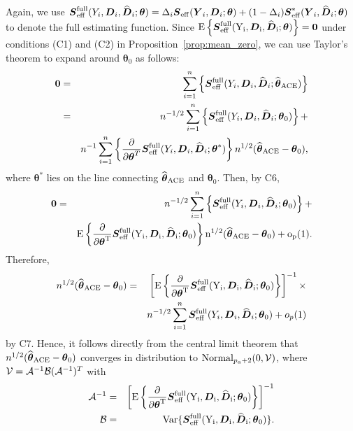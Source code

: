 \documentclass[12pt]{article}
\def\wh{\widehat}
\def\Normal{\hbox{Normal}}
\def\bse{\begin{eqnarray*}}
\def\ese{\end{eqnarray*}}
\def\bse{\begin{eqnarray*}}
\def\ese{\end{eqnarray*}}
\def\wh{\widehat}
\def\bS{{\mathbf S}}
\def\bzero{{\mathbf 0}}
\def\btheta{{\boldsymbol{\theta}}}
\def\bzero{{\boldsymbol{0}}}
\def\bD{{\boldsymbol D}}
\def\bS{{\boldsymbol S}}
\def\bY{{\boldsymbol Y}}
\def\tilD{\bD}
\def\ACEest{\wh{\btheta}_{\rm ACE}}
\def\E{\rm E}
\def\Var{\rm Var}
\begin{document}
Again, we use $\bS_{\rm{eff}}^{\rm{full}}(Y_i,\tilD_i,\widehat{\tilD}_i;\btheta) = \Delta_i\bS_{\rm{eff}}(\bY_i,\tilD_i;\btheta) + (1 - \Delta_i)\bS_{\rm{eff}}^*(\bY_i,\widehat{\tilD}_i;\btheta)$ to denote the full estimating function. Since $\E\left\{\bS_{\rm{eff}}^{\rm{full}}(Y_i,\tilD_i,\widehat{\tilD}_i;\btheta)\right\}=\bzero$ under conditions (C1) and (C2) in Proposition~\ref{prop:mean_zero}, we can use Taylor's theorem to expand around $\btheta_0$ as follows:
\bse
\bzero&=& \sum_{i=1}^n \left\{\bS_{\rm{eff}}^{\rm{full}}(Y_i,\tilD_i,\widehat{\tilD}_i;\ACEest)\right\}\\
&=& n^{-1/2}\sum_{i=1}^n \left\{\bS_{\rm{eff}}^{\rm{full}}(Y_i,\tilD_i,\widehat{\tilD}_i;\btheta_0)\right\} +\\
&&n^{-1}\sum_{i=1}^n \left\{\frac{\partial}{\partial \btheta^T} \bS_{\rm{eff}}^{\rm{full}}(Y_i,\tilD_i,\widehat{\tilD}_i;\btheta^*)\right\}n^{1/2}(\ACEest-\btheta_0),
\ese
where $\btheta^*$ lies on the line connecting $\ACEest$ and $\btheta_0$. Then, by C6,
\bse
\bzero&=& n^{-1/2}\sum_{i=1}^n \left\{\bS_{\rm{eff}}^{\rm{full}}(Y_i,\tilD_i,\widehat{\tilD}_i;\btheta_0)\right\} + \\
&&\E\left\{\frac{\partial}{\partial \btheta^T} \bS_{\rm{eff}}^{\rm{full}}(Y_i,\tilD_i,\widehat{\tilD}_i;\btheta_0)\right\}n^{1/2}(\ACEest-\btheta_0) + o_p(1).
\ese
Therefore, 
\bse
n^{1/2}(\ACEest-\btheta_0)&=&\left[\E\left\{\frac{\partial}{\partial \btheta^T} \bS_{\rm{eff}}^{\rm{full}}(Y_i,\tilD_i,\widehat{\tilD}_i;\btheta_0)\right\}\right]^{-1}\times\\
&&n^{-1/2}\sum_{i=1}^n \bS_{\rm{eff}}^{\rm{full}}(Y_i,\tilD_i,\widehat{\tilD}_i;\btheta_0)  + o_p(1)
\ese
by C7. Hence, it follows directly from the central limit theorem that $n^{1/2}(\ACEest-\btheta_0)$ converges in distribution to $\Normal_{p_a+2}(0, {\cal V})$, where ${\cal V} = {\cal A}^{-1} {\cal B} ({\cal A}^{-1})^T$ with 
\bse
{\cal A}^{-1}&=& \left[\E\left\{\frac{\partial}{\partial \btheta^T} \bS_{\rm{eff}}^{\rm{full}}(Y_i,\tilD_i,\widehat{\tilD}_i;\btheta_0)\right\}\right]^{-1}\\
{\cal B}&=&  \Var\{\bS_{\rm{eff}}^{\rm{full}}(Y_i,\tilD_i,\widehat{\tilD}_i;\btheta_0)\}.
\ese
\end{document}
